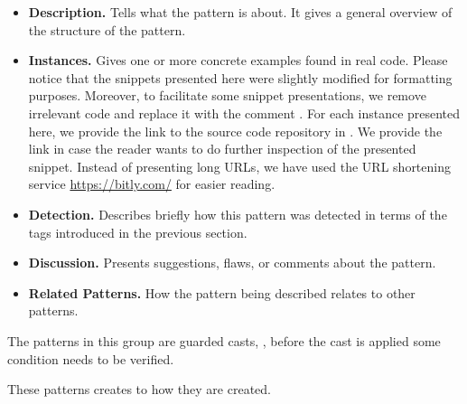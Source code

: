\begin{itemize}
\item \textbf{Description.}
Tells what the pattern is about.
It gives a general overview of the structure of the pattern.
\item \textbf{Instances.}
Gives one or more concrete examples found in real code.
Please notice that the snippets presented here were slightly
modified for formatting purposes.
Moreover, to facilitate some snippet presentations,
we remove irrelevant code and replace it with the
comment \code{// [...]}.
%
%
For each instance presented here, we provide the link to the source code repository in \lgtm{}.
We provide the link in case the reader wants to do further inspection
of the presented snippet.
%
%
Instead of presenting \lgtm{} long URLs,
we have used the URL shortening service \url{https://bitly.com/}
for easier reading.
\item \textbf{Detection.}
Describes briefly how this pattern was detected in terms of the tags introduced in the previous section.
\item \textbf{Discussion.}
Presents suggestions, flaws, or comments about the pattern.
\item \textbf{Related Patterns.}
How the pattern being described relates to other patterns.
%
%
\end{itemize}




The patterns in this group are guarded casts, \ie, before the cast is applied some condition needs to be verified.







These patterns creates to how they are created.











